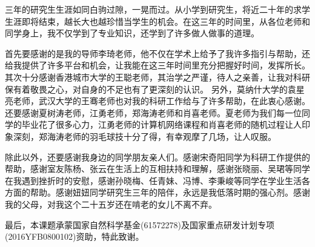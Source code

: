 \begin{acknowledgement}

  三年的研究生生涯如同白驹过隙，一晃而过。从小学到研究生，将近二十年的求学生涯即将结束，越长大也越珍惜当学生的机会。在这三年的时间里，从各位老师和同学身上，我不仅学到了专业知识，还学到了许多做人做事的道理。

  首先要感谢的是我的导师李琦老师，他不仅在学术上给予了我许多指引与帮助，还给我提供了许多平台和机会，让我能在这三年时间里充分把握好时间，发挥所长。
  其次十分感谢香港城市大学的王聪老师，其治学之严谨，待人之亲善，让我对科研保有着敬畏之心，对自身的不足也有了更深刻的认识。
  另外，莫纳什大学的袁星亮老师，武汉大学的王骞老师也对我的科研工作给与了许多帮助，在此衷心感谢。
  还要感谢夏树涛老师，江勇老师，郑海涛老师和肖喜老师。夏老师为我们每一位同学的毕业花了很多心力，江勇老师的计算机网络课程和肖喜老师的随机过程让人印象深刻，郑海涛老师的羽毛球技十分了得，有幸观摩了几场，让人叹服。

  除此以外，还要感谢我身边的同学朋友亲人们。感谢宋奇阳同学为科研工作提供的帮助，感谢室友陈杨、张云在生活上的互相扶持和理解，感谢张晓丽、吴珺等同学在我遇到挫折时的安慰，感谢孙晓梅、任青妹、冯博、李秉峻等同学在学业生活各方面的帮助。感谢妞妞同学研究生三年的陪伴，永远是我低落时期的强心剂。感谢我的父母，对我这个二十五岁还在啃老的女儿不离不弃。


  最后，本课题承蒙国家自然科学基金(61572278)及国家重点研发计划专项(2016YFB0800102)资助，特此致谢。

\end{acknowledgement}
